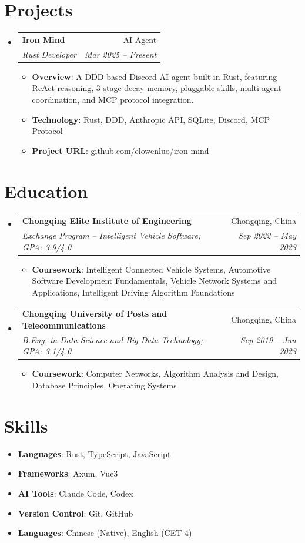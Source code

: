\documentclass[letterpaper,11pt]{article}
\makeatletter
\newcommand{\resumeItem}[2]{
  \item\small{
    \textbf{#1}{: #2 \vspace{-2pt}}
  }
}
\newcommand{\resumeSubheading}[4]{
  \vspace{-1pt}\item
    \begin{tabular*}{0.97\textwidth}[t]{l@{\extracolsep{\fill}}r}
      \textbf{#1} & #2 \\
      \textit{\small#3} & \textit{\small #4} \\
    \end{tabular*}\vspace{-5pt}
}
\newcommand{\resumeSubHeadingListStart}{\begin{itemize}[leftmargin=*]}
\newcommand{\resumeSubHeadingListEnd}{\end{itemize}}
\newcommand{\resumeItemListStart}{\begin{itemize}}
\newcommand{\resumeItemListEnd}{\end{itemize}\vspace{-5pt}}
\makeatother
\begin{document}
\section{Projects}
  \resumeSubHeadingListStart
    \resumeSubheading
      {Iron Mind}{AI Agent}
      {Rust Developer}{Mar 2025 -- Present}
      \resumeItemListStart
        \resumeItem{Overview}
          {A DDD-based Discord AI agent built in Rust, featuring ReAct reasoning, 3-stage decay memory, pluggable skills, multi-agent coordination, and MCP protocol integration.}
        \resumeItem{Technology}
          {Rust, DDD, Anthropic API, SQLite, Discord, MCP Protocol}
        \resumeItem{Project URL}
          {\href{https://github.com/elowenluo/iron-mind}{github.com/elowenluo/iron-mind}}
      \resumeItemListEnd
  \resumeSubHeadingListEnd

\section{Education}
  \resumeSubHeadingListStart
    \resumeSubheading
      {Chongqing Elite Institute of Engineering}{Chongqing, China}
      {Exchange Program -- Intelligent Vehicle Software; GPA: 3.9/4.0}{Sep 2022 -- May 2023}
      \resumeItemListStart
        \resumeItem{Coursework}
          {Intelligent Connected Vehicle Systems, Automotive Software Development Fundamentals, Vehicle Network Systems and Applications, Intelligent Driving Algorithm Foundations}
      \resumeItemListEnd
    \resumeSubheading
      {Chongqing University of Posts and Telecommunications}{Chongqing, China}
      {B.Eng. in Data Science and Big Data Technology; GPA: 3.1/4.0}{Sep 2019 -- Jun 2023}
      \resumeItemListStart
        \resumeItem{Coursework}
          {Computer Networks, Algorithm Analysis and Design, Database Principles, Operating Systems}
      \resumeItemListEnd
  \resumeSubHeadingListEnd

\section{Skills}
  \resumeSubHeadingListStart
    \item{
      \textbf{Languages}{: Rust, TypeScript, JavaScript}
    }
    \item{
      \textbf{Frameworks}{: Axum, Vue3}
    }
    \item{
      \textbf{AI Tools}{: Claude Code, Codex}
    }
    \item{
      \textbf{Version Control}{: Git, GitHub}
    }
    \item{
      \textbf{Languages}{: Chinese (Native), English (CET-4)}
    }
  \resumeSubHeadingListEnd

\end{document}
